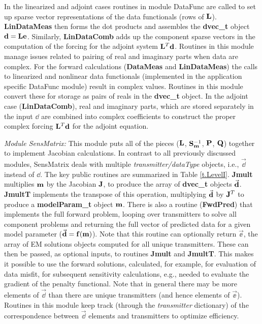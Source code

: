 In the linearized and adjoint
cases routines in module DataFunc are called
to set up sparse vector representations
of the data functionals (rows of ${\bf L}$).
{\bf LinDataMeas} then forms the dot
products and assembles the {\bf dvec\_t} object ${\bf d} = {\bf L}{\bf e}$.
Similarly, {\bf LinDataComb}
adds up the component sparse vectors in the
computation of the forcing for the adjoint system ${\bf L}^T{\bf d}$.
Routines in this module manage issues 
related to pairing of real and imaginary parts 
when data are complex.
For the forward calculations ({\bf DataMeas} 
and {\bf LinDataMeas}) the
calls to linearized and nonlinear data functionals (implemented in the
application specific DataFunc module) result in complex values.
Routines in this module convert these for 
storage as pairs of reals in the {\bf dvec\_t} object.
In the adjoint case ({\bf LinDataComb}), real and imaginary parts,
which are stored separately in the input $\dd$
are combined into complex coefficients to construct 
the proper complex forcing ${\bf L}^T {\bf d}$
for the adjoint equation.  

\vspace{6pt}
\noindent
{\it Module SensMatrix:}  This module 
puts all of the pieces (${\bf L}$, ${\bf S}_{\bf m}^{-1}$, ${\bf P}$,
${\bf Q}$) together to implement Jacobian calculations.  In
contrast to all previously discussed modules, SensMatrix deals
with multiple {\em transmitter/dataType} objects,
i.e., $\vec\dd$ instead of $\dd$.  The key public routines
are summarized in Table \ref{t.LevelI}.  {\bf Jmult}
multiplies ${\bf m}$ by the Jacobian ${\bf J}$, to produce
the array of {\bf dvec\_t} objects $\vec{\bf d}$.
{\bf JmultT} implements the transpose of this operation, multiplying
$\vec{\bf d}$ by ${\bf J}^T$ to produce 
a {\bf modelParam\_t} object ${\bf m}$.
There is also a routine ({\bf FwdPred}) that implements the full forward
problem, looping over transmitters to solve all component
problems and returning the full vector of predicted data
for a given model parameter ($\vec{\bf d} = {\bf f}({\bf m})$).
Note that this routine can optionally return $\vec\ee$,
the array of EM solutions objects computed for all unique transmitters.
These can then be passed, as optional inputs, to routines
{\bf Jmult} and {\bf JmultT}.  This makes it possible to use
the forward solutions, calculated, for example, for evaluation of 
data misfit, for subsequent sensitivity calculations, e.g., needed
to evaluate the gradient of the penalty functional.
Note that in general there may be more elements of $\vec\dd$
than there are unique transmitters (and hence elements of $\vec\ee$).
Routines in this module keep track 
(through the {\em transmitter} dictionary)
of the correspondence between $\vec\dd$ elements and transmitters
to optimize efficiency.

